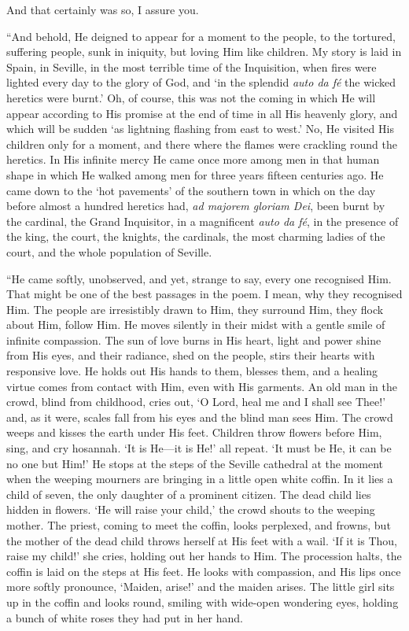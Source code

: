 \noindent And that certainly was so, I assure you.

``And behold, He deigned to appear for a moment to the people, to the
tortured, suffering people, sunk in iniquity, but loving Him like
children. My story is laid in Spain, in Seville, in the most terrible
time of the Inquisition, when fires were lighted every day to the
glory of God, and `in the splendid \textit{auto da f\'e} the wicked
heretics were burnt.' Oh, of course, this was not the coming in which
He will appear according to His promise at the end of time in all His
heavenly glory, and which will be sudden `as lightning flashing from
east to west.' No, He visited His children only for a moment, and
there where the flames were crackling round the heretics. In His
infinite mercy He came once more among men in that human shape in
which He walked among men for three years fifteen centuries ago. He
came down to the `hot pavements' of the southern town in which on the
day before almost a hundred heretics had, \textit{ad majorem gloriam
Dei}, been burnt by the cardinal, the Grand Inquisitor, in a
magnificent \textit{auto da f\'e}, in the presence of the king,
 the court, the knights, the cardinals, the most charming
ladies of the court, and the whole population of Seville.

``He came softly, unobserved, and yet, strange to say, every one
recognised Him. That might be one of the best passages in the poem. I
mean, why they recognised Him. The people are irresistibly drawn to
Him, they surround Him, they flock about Him, follow Him. He moves
silently in their midst with a gentle smile of infinite compassion.
The sun of love burns in His heart, light and power shine from His
eyes, and their radiance, shed on the people, stirs their hearts with
responsive love. He holds out His hands to them, blesses them, and a
healing virtue comes from contact with Him, even with His garments. An
old man in the crowd, blind from childhood, cries out, `O Lord, heal
me and I shall see Thee!' and, as it were, scales fall from his eyes
and the blind man sees Him. The crowd weeps and kisses the earth under
His feet. Children throw flowers before Him, sing, and cry hosannah.
`It is He---it is He!' all repeat. `It must be He, it can be no one
but Him!' He stops at the steps of the Seville cathedral at the moment
when the weeping mourners are bringing in a little open white coffin.
In it lies a child of seven, the only daughter of a prominent citizen.
The dead child lies hidden in flowers. `He will raise your child,' the
crowd shouts to the weeping mother. The priest, coming to meet the
coffin, looks perplexed, and frowns, but the mother of the dead child
throws herself at His feet with a wail. `If it is Thou, raise my
child!' she cries, holding out her hands to Him. The procession halts,
the coffin is laid on the steps at His feet. He looks with compassion,
and His lips once more softly pronounce, `Maiden, arise!' and the
maiden arises. The little girl sits up in the coffin and looks round,
smiling with wide-open wondering eyes, holding a bunch of white roses
they had put in her hand.

